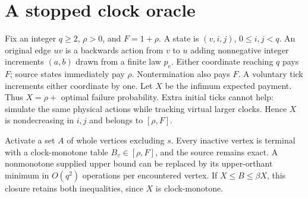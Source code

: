 \documentclass[acmsmall,11pt,screen,nonacm]{acmart}
\begin{document}
\section{A stopped clock oracle}\label{sec:oracle}
Fix an integer $q\ge2$, $\rho>0$, and $F=1+\rho$. A state is $(v,i,j)$, $0\le i,j<q$. An original edge $uv$ is a backwards action from $v$ to $u$ adding nonnegative integer increments $(a,b)$ drawn from a finite law $p_e$. Either coordinate reaching $q$ pays $F$; source states immediately pay $\rho$. Nontermination also pays $F$. A voluntary tick increments either coordinate by one. Let $X$ be the infimum expected payment. Thus $X=\rho+$ optimal failure probability. Extra initial ticks cannot help: simulate the same physical actions while tracking virtual larger clocks. Hence $X$ is nondecreasing in $i,j$ and belongs to $[\rho,F]$.

Activate a set $A$ of whole vertices excluding $s$. Every inactive vertex is terminal with a clock-monotone table $B_v\in[\rho,F]$, and the source remains exact. A nonmonotone supplied upper bound can be replaced by its upper-orthant minimum in $O(q^2)$ operations per encountered vertex. If $X\le B\le\beta X$, this closure retains both inequalities, since $X$ is clock-monotone.
\end{document}
